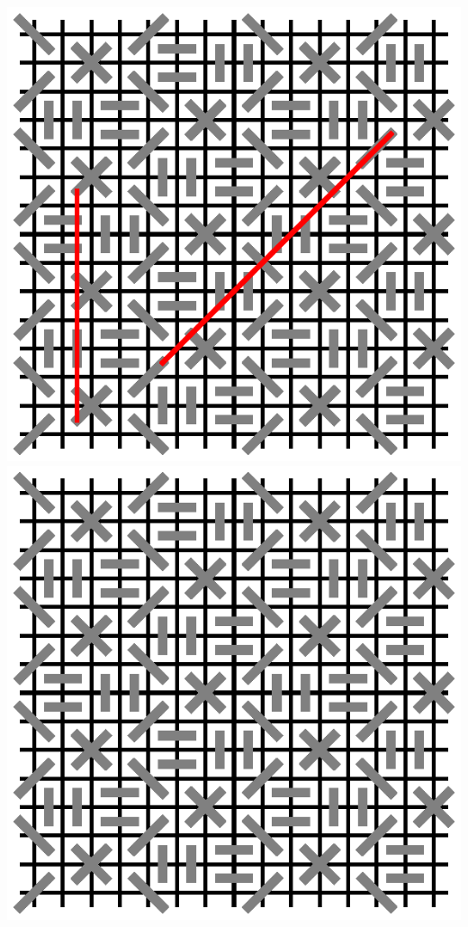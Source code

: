 \documentclass{article}
\begin{document}
\includegraphics{m-n-9.eps}
\\
\includegraphics{m-n-9-clear.eps}
\\
\end{document}
